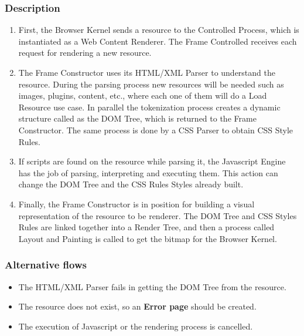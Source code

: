 \documentclass{sig-alternate-05-2015}
\begin{document}
    \subsubsection*{Description}
      \begin{enumerate}
        \item First, the Browser Kernel sends a resource to the Controlled Process, which is instantiated as a Web Content Renderer. The Frame Controlled receives each request for rendering a new resource.
        \item The Frame Constructor uses its HTML/XML Parser to understand the resource. During the parsing process new resources will be needed such as images, plugins, content, etc., where each one of them will do a Load Resource use case. In parallel the tokenization process creates a dynamic structure called as the DOM Tree, which is returned to the Frame Constructor. The same process is done by a CSS Parser to obtain CSS Style Rules.
        \item If scripts are found on the resource while parsing it, the Javascript Engine has the job of parsing, interpreting and executing them. This action can change the DOM Tree and the CSS Rules Styles already built.
        \item Finally, the Frame Constructor is in position for building a visual representation of the resource to be renderer. The DOM Tree and CSS Styles Rules are linked together into a Render Tree, and then a process called Layout and Painting is called to get the bitmap for the Browser Kernel.
      \end{enumerate}
    \subsubsection*{Alternative flows} 
    \begin{itemize}
    \item The HTML/XML Parser fails in getting the DOM Tree from the resource.
    \item The resource does not exist, so an \textbf{Error page} should be created. 
    \item The execution of Javascript or the rendering process is cancelled.
      \end{itemize}
\end{document}

